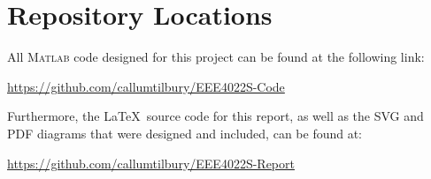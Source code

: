 \documentclass[class=report,11pt,crop=false]{standalone}
\begin{document}
\chapter{Repository Locations}
All \textsc{Matlab} code designed for this project can be found at the following link:

\begin{center}
    \url{https://github.com/callumtilbury/EEE4022S-Code}
\end{center}

\vspace{1cm}

Furthermore, the \LaTeX~source code for this report, as well as the SVG and PDF diagrams that were designed and included, can be found at:

\begin{center}
    \url{https://github.com/callumtilbury/EEE4022S-Report}
\end{center}
\ifstandalone
% 
\fi
\end{document}
